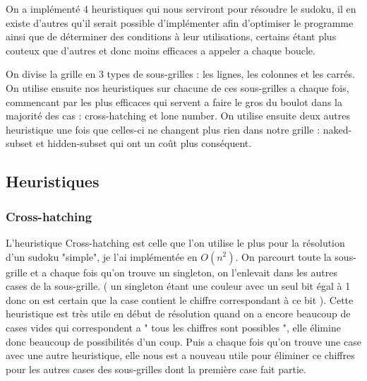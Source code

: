 \documentclass[11pt,a4paper]{article}
\begin{document}
\hspace{10} 
On a implémenté 4 heuristiques qui nous serviront pour résoudre le sudoku, il en existe d'autres qu'il serait possible d'implémenter afin d'optimiser le programme ainsi que de déterminer des conditions à leur utilisations, certains étant plus couteux que d'autres et donc moins efficaces a appeler a chaque boucle. 

\hspace{10} 
On divise la grille en 3 types de sous-grilles : les lignes, les colonnes et les carrés. On utilise ensuite nos heuristiques sur chacune de ces sous-grilles a chaque fois, commencant par les plus efficaces qui servent a faire le gros du boulot dans la majorité des cas : cross-hatching et lone number. On utilise ensuite deux autres heuristique une fois que celles-ci ne changent plus rien dans notre grille : naked-subset et hidden-subset qui ont un coût plus conséquent.

\subsection{Heuristiques}
\subsubsection{Cross-hatching}
\hspace{10} 
L'heuristique Cross-hatching est celle que l'on utilise le plus pour la résolution d'un sudoku "simple", je l'ai implémentée en $O(n^2)$. On parcourt toute la sous-grille et a chaque fois qu'on trouve un singleton, on l'enlevait dans les autres cases de la sous-grille. ( un singleton étant une couleur avec un seul bit égal à 1 donc on est certain que la case contient le chiffre correspondant à ce bit ). Cette heuristique est très utile en début de résolution quand on a encore beaucoup de cases vides qui correspondent a " tous les chiffres sont possibles ", elle élimine donc beaucoup de possibilités d'un coup. Puis a chaque fois qu'on trouve une case avec une autre heuristique, elle nous est a nouveau utile pour éliminer ce chiffres pour les autres cases des sous-grilles dont la première case fait partie.
\end{document}
